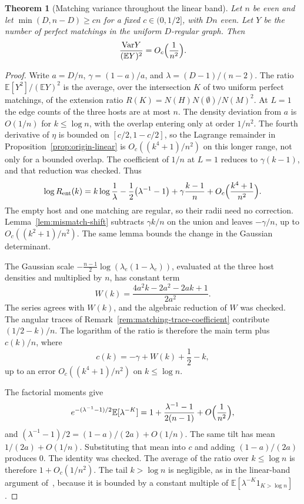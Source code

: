 \documentclass[11pt]{article}
\newtheorem{theorem}{Theorem}
\newcommand{\EE}{\mathbb{E}}
\newcommand{\Var}{\mathrm{Var}}
\begin{document}
\begin{theorem}[Matching variance throughout the linear band]
\label{thm:matching-linear-rate}
Let \(n\) be even and let \(\min(D,n-D)\ge cn\) for a fixed \(c\in(0,1/2]\),
with \(Dn\) even. Let \(Y\) be the number of perfect matchings in the uniform
\(D\)-regular graph. Then
\[
\frac{\Var Y}{(\EE Y)^2}=O_c\Bigl(\frac1{n^2}\Bigr).
\]
\end{theorem}

\begin{proof}
Write \(a=D/n\), \(\gamma=(1-a)/a\), and \(\lambda=(D-1)/(n-2)\).
The ratio \(\EE[Y^2]/(\EE Y)^2\) is the average, over the intersection \(K\) of
two uniform perfect matchings, of the extension ratio
\(R(K)=N(H)N(\emptyset)/N(M)^2\).
At \(L=1\) the edge counts of the three hosts are at most \(n\). The density
deviation from \(a\) is \(O(1/n)\) for \(k\le\log n\), with the overlap entering
only at order \(1/n^2\). The fourth derivative of \(\eta\) is bounded on
\([c/2,1-c/2]\), so the Lagrange remainder in
Proposition~\ref{prop:origin-linear} is \(O_c((k^4+1)/n^2)\) on this longer
range, not only for a bounded overlap. The coefficient of \(1/n\) at \(L=1\)
reduces to \(\gamma(k-1)\), and that reduction was checked. Thus
\[
\log R_{\mathrm{ent}}(k)
=
k\log\frac1\lambda-\frac12\bigl(\lambda^{-1}-1\bigr)
+\gamma\frac{k-1}{n}
+O_c\Bigl(\frac{k^4+1}{n^2}\Bigr).
\]
The empty host and one matching are regular, so their radii need no
correction. Lemma~\ref{lem:mismatch-shift} subtracts \(\gamma k/n\) on the
union and leaves \(-\gamma/n\), up to \(O_c((k^2+1)/n^2)\). The same lemma
bounds the change in the Gaussian determinant.

The Gaussian scale \(-\frac{n-1}{2}\log(\lambda_e(1-\lambda_e))\), evaluated at
the three host densities and multiplied by \(n\), has constant term
\[
W(k)=\frac{4a^2 k-2a^2-2ak+1}{2a^2}.
\]
The series agrees with \(W(k)\), and the algebraic reduction of \(W\) was
checked. The angular traces of Remark~\ref{rem:matching-trace-coefficient}
contribute \((1/2-k)/n\).
The logarithm of the ratio is therefore the main term plus \(c(k)/n\), where
\[
c(k)=-\gamma+W(k)+\frac12-k,
\]
up to an error \(O_c((k^4+1)/n^2)\) on \(k\le\log n\).

The factorial moments give
\[
e^{-(\lambda^{-1}-1)/2}\EE[\lambda^{-K}]
=
1+\frac{\lambda^{-1}-1}{2(n-1)}+O\Bigl(\frac1{n^2}\Bigr),
\]
and \((\lambda^{-1}-1)/2=(1-a)/(2a)+O(1/n)\).
The same tilt has mean \(1/(2a)+O(1/n)\).
Substituting that mean into \(c\) and adding \((1-a)/(2a)\) produces \(0\).
The identity was checked.
The average of the ratio over \(k\le\log n\) is therefore \(1+O_c(1/n^2)\).
The tail \(k>\log n\) is negligible, as in the linear-band argument
of~\cite{PlusOneV1}, because it is bounded by a constant multiple of
\(\EE[\lambda^{-K}1_{K>\log n}]\).
\end{proof}
\end{document}

